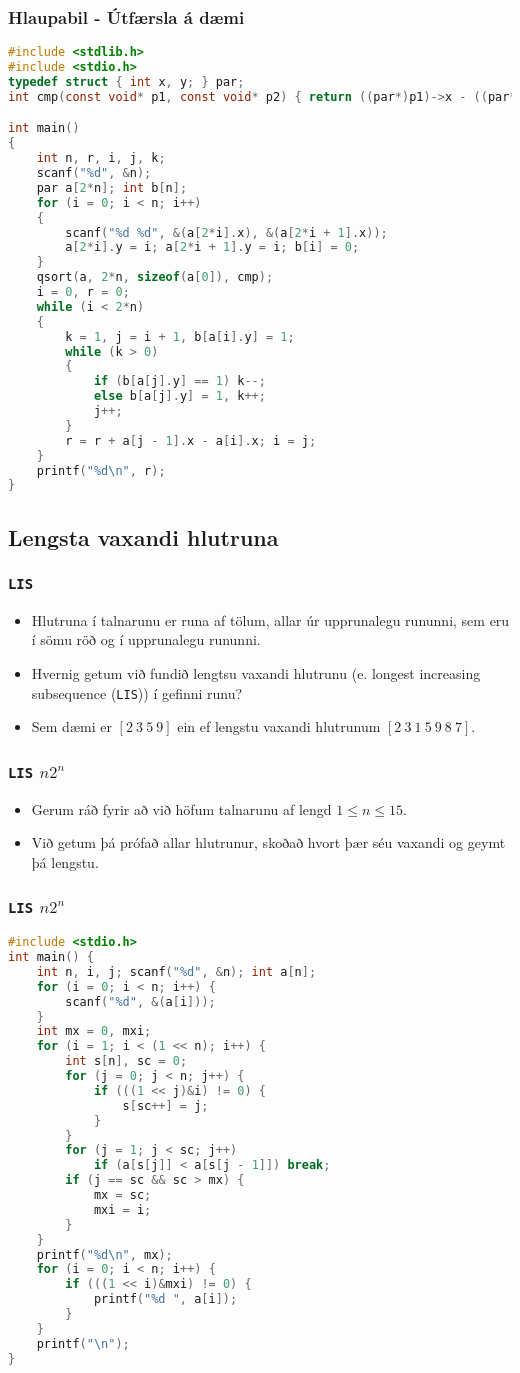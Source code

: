 \documentclass{beamer}
\begin{document}
\begin{frame}[fragile]
	\frametitle{Hlaupabil - Útfærsla á dæmi}
	\tiny
	\begin{lstlisting}[language=C]
#include <stdlib.h>
#include <stdio.h>
typedef struct { int x, y; } par;
int cmp(const void* p1, const void* p2) { return ((par*)p1)->x - ((par*)p2)->x; }

int main()
{
	int n, r, i, j, k;
	scanf("%d", &n);
	par a[2*n]; int b[n];
	for (i = 0; i < n; i++)
	{
		scanf("%d %d", &(a[2*i].x), &(a[2*i + 1].x));
		a[2*i].y = i; a[2*i + 1].y = i; b[i] = 0;
	}
	qsort(a, 2*n, sizeof(a[0]), cmp);
	i = 0, r = 0;
	while (i < 2*n)
	{
		k = 1, j = i + 1, b[a[i].y] = 1;
		while (k > 0)
		{
			if (b[a[j].y] == 1) k--;
			else b[a[j].y] = 1, k++;
			j++;
		}
		r = r + a[j - 1].x - a[i].x; i = j;
	}
	printf("%d\n", r);
}
	\end{lstlisting}
\end{frame}

\subsection{Lengsta vaxandi hlutruna}

\begin{frame}
	\frametitle{\texttt{LIS}}
	\begin{itemize}
		\item<1-> Hlutruna í talnarunu er runa af tölum, allar úr upprunalegu rununni, sem eru í sömu röð og
			í upprunalegu rununni.
		\item<2-> Hvernig getum við fundið lengtsu vaxandi hlutrunu (e. longest increasing subsequence (\texttt{LIS}))
			í gefinni runu?
		\item<3-> Sem dæmi er $[2\ 3\ 5\ 9]$  ein ef lengstu vaxandi hlutrunum $[2\ 3\ 1\ 5\ 9\ 8\ 7]$.
	\end{itemize}
\end{frame}

\begin{frame}
	\frametitle{\texttt{LIS} $n2^n$}
	\begin{itemize}
		\item<1-> Gerum ráð fyrir að við höfum talnarunu af lengd $1 \leq n \leq 15$.
		\item<2-> Við getum þá prófað allar hlutrunur, skoðað hvort þær séu vaxandi og geymt þá lengstu.
	\end{itemize}
\end{frame}

\begin{frame}[fragile]
	\frametitle{\texttt{LIS} $n2^n$}
	\tiny
	\begin{lstlisting}[language=C]
#include <stdio.h>
int main() {
	int n, i, j; scanf("%d", &n); int a[n];
	for (i = 0; i < n; i++) {
		scanf("%d", &(a[i]));
	}
	int mx = 0, mxi;
	for (i = 1; i < (1 << n); i++) {
		int s[n], sc = 0;
		for (j = 0; j < n; j++) {
			if (((1 << j)&i) != 0) {
				s[sc++] = j;
			}
		}
		for (j = 1; j < sc; j++)
			if (a[s[j]] < a[s[j - 1]]) break;
		if (j == sc && sc > mx) {
			mx = sc;
			mxi = i;
		}
	}
	printf("%d\n", mx);
	for (i = 0; i < n; i++) {
		if (((1 << i)&mxi) != 0) {
			printf("%d ", a[i]);
		}
	}
	printf("\n");
}
	\end{lstlisting}
\end{frame}
\end{document}
